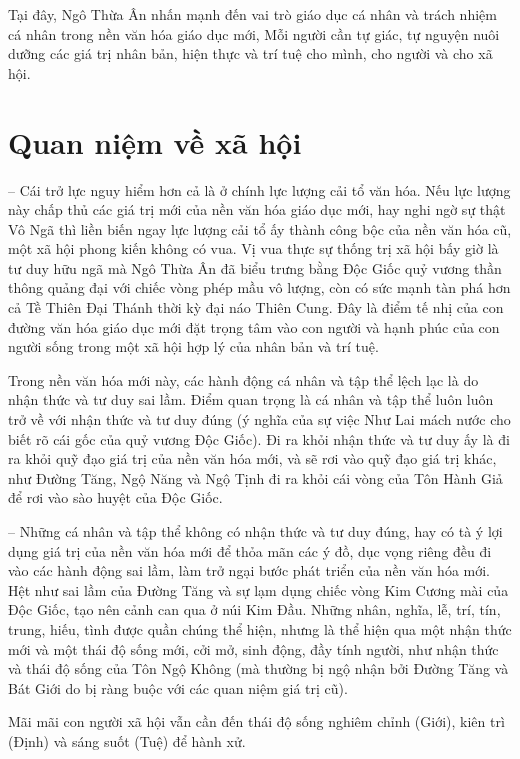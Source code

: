 Tại đây, Ngô Thừa Ân nhấn mạnh đến vai trò giáo dục cá nhân và trách nhiệm cá nhân trong nền văn hóa giáo dục mới, Mỗi người cần tự giác, tự nguyện nuôi dưỡng các giá trị nhân bản, hiện thực và trí tuệ cho mình, cho người và cho xã hội.

\section{Quan niệm về xã hội} %
\label{sec:50_51_xa_hoi}

-- Cái trở lực nguy hiểm hơn cả là ở chính lực lượng cải tổ văn hóa. Nếu lực lượng này chấp thủ các giá trị mới của nền văn hóa giáo dục mới, hay nghi ngờ sự thật Vô Ngã thì liền biến ngay lực lượng cải tổ ấy thành công bộc của nền văn hóa cũ, một xã hội phong kiến không có vua. Vị vua thực sự thống trị xã hội bấy giờ là tư duy hữu ngã mà Ngô Thừa Ân đã biểu trưng bằng Độc Giốc quỷ vương thần thông quảng đại với chiếc vòng phép mầu vô lượng, còn có sức mạnh tàn phá hơn cả Tề Thiên Đại Thánh thời kỳ đại náo Thiên Cung. Đây là điểm tế nhị của con đường văn hóa giáo dục mới đặt trọng tâm vào con người và hạnh phúc của con người sống trong một xã hội hợp lý của nhân bản và trí tuệ.

Trong nền văn hóa mới này, các hành động cá nhân và tập thể lệch lạc là do nhận thức và tư duy sai lầm. Điểm quan trọng là cá nhân và tập thể luôn luôn trở về với nhận thức và tư duy đúng (ý nghĩa của sự việc Như Lai mách nước cho biết rõ cái gốc của quỷ vương Độc Giốc). Đi ra khỏi nhận thức và tư duy ấy là đi ra khỏi quỹ đạo giá trị của nền văn hóa mới, và sẽ rơi vào quỹ đạo giá trị khác, như Đường Tăng, Ngộ Năng và Ngộ Tịnh đi ra khỏi cái vòng của Tôn Hành Giả để rơi vào sào huyệt của Độc Giốc.

-- Những cá nhân và tập thể không có nhận thức và tư duy đúng, hay có tà ý lợi dụng giá trị của nền văn hóa mới để thỏa mãn các ý đồ, dục vọng riêng đều đi vào các hành động sai lầm, làm trở ngại bước phát triển của nền văn hóa mới. Hệt như sai lầm của Đường Tăng và sự lạm dụng chiếc vòng Kim Cương mài của Độc Giốc, tạo nên cảnh can qua ở núi Kim Đầu. Những nhân, nghĩa, lễ, trí, tín, trung, hiếu, tình được quần chúng thể hiện, nhưng là thể hiện qua một nhận thức mới và một thái độ sống mới, cởi mở, sinh động, đầy tính người, như nhận thức và thái độ sống của Tôn Ngộ Không (mà thường bị ngộ nhận bởi Đường Tăng và Bát Giới do bị ràng buộc với các quan niệm giá trị cũ).

Mãi mãi con người xã hội vẫn cần đến thái độ sống nghiêm chỉnh (Giới), kiên trì (Định) và sáng suốt (Tuệ) để hành xử.
